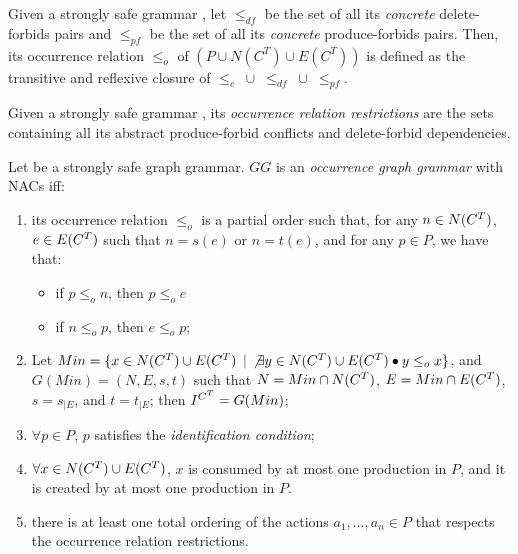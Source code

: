 \begin{definition} Given a strongly safe grammar \doublyTypedGraphGrammarCore{}, let $\leq_{df}$ be the set of all its \emph{concrete} delete-forbids pairs and $\leq_{pf}$ be the set of all its \emph{concrete} produce-forbids pairs. Then, its occurrence relation $\leq_o$ of $(P \cup N(C^T) \cup E(C^T))$ is defined as the transitive and reflexive closure of \mbox{$\leq_{c}$ $\cup$ $\leq_{df}$ $\cup$ $\leq_{pf}$}.
\end{definition}

\begin{definition} Given a strongly safe grammar \doublyTypedGraphGrammarCore{}, its \emph{occurrence relation restrictions} are the sets containing all its abstract produce-forbid conflicts and delete-forbid dependencies.
\end{definition}

\begin{definition}\label{def:ogg} Let \doublyTypedGraphGrammarCore{} be a strongly safe graph grammar. $GG$ is an \emph{occurrence graph grammar} with NACs iff:

  \begin{enumerate}
    \item its occurrence relation $\leq_{o}$ is a partial order such that, for any \mbox{$n \in N(C^T)$}, \mbox{$e \in E(C^T)$} such that $n = s(e)$ or $n = t(e)$, and for any $p \in P$, we have that:
      \begin{itemize}
        \item if $p \leq_o n$, then $p \leq_o e$
        \item if $n \leq_o p$, then $e \leq_o p$;
      \end{itemize}
    \item Let $Min = \{x \in N(C^T) \cup E(C^T)$ $|$ $\not\exists y \in N(C^T) \cup E(C^T)\bullet y \leq_o x \}$, and $G(Min) = \left(N,E,s,t\right)$ such that $N = Min \cap N(C^T)$, $E = Min \cap E(C^T)$, $s = s_{|E}$, and $t = t_{|E}$; then $\mbox{\ensuremath{I^{C^T}}} = G(Min)$;
    \item $\forall p \in P$, $p$ satisfies the \emph{identification condition};
    \item $\forall x \in N(C^T) \cup E(C^T)$, $x$ is consumed by at most one production in $P$, and it is created by at most one production in $P$.
    \item there is at least one total ordering of the actions $a_1,\ldots,a_n \in P$ that respects the occurrence relation restrictions.
  \end{enumerate}
\end{definition}

